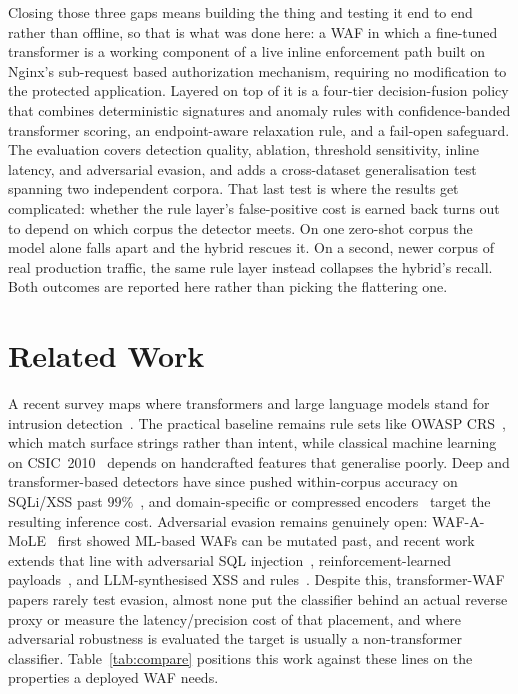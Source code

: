 \documentclass[conference]{IEEEtran}
\begin{document}
Closing those three gaps means building the thing and testing it end to
end rather than offline, so that is what was done here: a WAF in which a
fine-tuned transformer is a working component of a live inline enforcement
path built on Nginx's sub-request based authorization mechanism, requiring
no modification to the protected application. Layered on top of it is a
four-tier decision-fusion policy that combines deterministic signatures and
anomaly rules with confidence-banded transformer scoring, an
endpoint-aware relaxation rule, and a fail-open safeguard. The evaluation
covers detection quality, ablation, threshold sensitivity, inline latency,
and adversarial evasion, and adds a cross-dataset generalisation test
spanning two independent corpora. That last test is where the results get
complicated: whether the rule layer's false-positive cost is earned back
turns out to depend on which corpus the detector meets. On one zero-shot
corpus the model alone falls apart and the hybrid rescues it. On a second,
newer corpus of real production traffic, the same rule layer instead
collapses the hybrid's recall. Both outcomes are reported here rather than
picking the flattering one.

\section{Related Work}
A recent survey maps where transformers and large language models stand
for intrusion detection~\cite{kheddar2025survey}. The practical baseline
remains rule sets like OWASP CRS~\cite{owaspcrs}, which match surface
strings rather than intent, while classical machine learning on
CSIC~2010~\cite{payloadml2024svmrfxgb} depends on handcrafted features
that generalise poorly. Deep and transformer-based detectors have since
pushed within-corpus accuracy on SQLi/XSS past
$99\%$~\cite{scireports2024novelxsssqli,liu2024bertlstm,wadbert2026,zhou2025ewebguard,yang2025bertids,sdnbert2024},
and domain-specific or compressed
encoders~\cite{aghaei2022securebert,aghaei2025securebert2,sanh2019distilbert}
target the resulting inference cost. Adversarial evasion remains
genuinely open: WAF-A-MoLE~\cite{demetrio2020wafamole} first showed
ML-based WAFs can be mutated past, and recent work extends that line with
adversarial SQL injection~\cite{advsqli2024}, reinforcement-learned
payloads~\cite{mlwaf2025peerj}, and LLM-synthesised XSS and
rules~\cite{genxss2025}. Despite this, transformer-WAF papers rarely test
evasion, almost none put the classifier behind an actual reverse proxy or
measure the latency/precision cost of that placement, and where
adversarial robustness is evaluated the target is usually a
non-transformer classifier. Table~\ref{tab:compare} positions this work
against these lines on the properties a deployed WAF needs.
\end{document}
